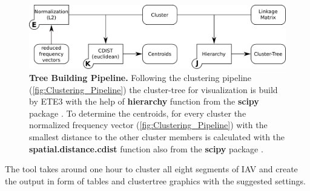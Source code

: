 \begin{figure}[!hbt]
    \centering
    \includegraphics[width=\textwidth]{Graphics/Tree.pdf}
    \caption[Tree Building Pipeline]{\textbf{Tree Building Pipeline.} Following the clustering pipeline (\autoref{fig:Clustering_Pipeline}) the cluster-tree for visualization is build by ETE3 with the help of \textbf{hierarchy} function from the \textbf{scipy} package \autocite{huerta-cepas_ete_2016, scipy_10_contributors_scipy_2020}. To determine the centroids, for every cluster the normalized frequency vector (\autoref{fig:Clustering_Pipeline}) with the smallest distance to the other cluster members is calculated with the \textbf{spatial.distance.cdist} function also from the \textbf{scipy} package \autocite{scipy_10_contributors_scipy_2020}.}
    \label{fig:Tree_Pipeline}
\end{figure}

The tool takes around one hour to cluster all eight segments of \gls{IAV} and create the output in form of tables and clustertree graphics with the suggested settings. 

\nopagebreak[1]













